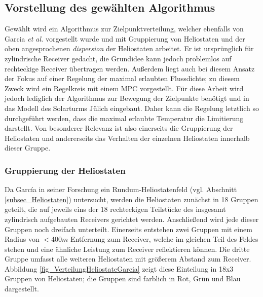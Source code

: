 \subsection{Vorstellung des gewählten Algorithmus} \label{subsec_ZielpunktregelungGarcia}
Gewählt wird ein Algorithmus zur Zielpunktverteilung, welcher ebenfalls von Garcia \textit{et al.} \cite{Garcia2} vorgestellt wurde und mit Gruppierung von Heliostaten und der oben angesprochenen \textit{dispersion} der Heliostaten arbeitet.
Er ist ursprünglich für zylindrische Receiver gedacht, die Grundidee kann jedoch problemlos auf rechteckige Receiver übertragen werden.
Außerdem liegt auch bei diesem Ansatz der Fokus auf einer Regelung der maximal erlaubten Flussdichte; zu diesem Zweck wird ein Regelkreis mit einem MPC vorgestellt.
Für diese Arbeit wird jedoch lediglich der Algorithmus zur Bewegung der Zielpunkte benötigt und in das Modell des Solarturms Jülich eingebaut.
Daher kann die Regelung letztlich so durchgeführt werden, dass die maximal erlaubte Temperatur die Limitierung darstellt.
Von besonderer Relevanz ist also einerseits die Gruppierung der Heliostaten und andererseits das Verhalten der einzelnen Heliostaten innerhalb dieser Gruppe.

\subsubsection*{Gruppierung der Heliostaten} \label{subsubsec_Gruppierung}
Da García in seiner Forschung ein Rundum-Heliostatenfeld (vgl. Abschnitt \ref{subsec_Heliostaten}) untersucht, werden die Heliostaten zunächst in 18 Gruppen geteilt, die auf jeweils eins der 18 rechteckigen Teilstücke des insgesamt zylindrisch aufgebauten Receivers gerichtet werden.
Anschließend wird jede dieser Gruppen noch dreifach unterteilt.
Einerseits entstehen zwei Gruppen mit einem Radius von $<400m$ Entfernung zum Receiver, welche im gleichen Teil des Feldes stehen und eine ähnliche Leistung zum Receiver reflektieren können.
Die dritte Gruppe umfasst alle weiteren Heliostaten mit größerem Abstand zum Receiver. \cite[S.8-10]{Garcia2}\\
Abbildung \ref{fig_VerteilungHeliostateGarcia} zeigt diese Einteilung in 18x3 Gruppen von Heliostaten; die Gruppen sind farblich in Rot, Grün und Blau dargestellt.

